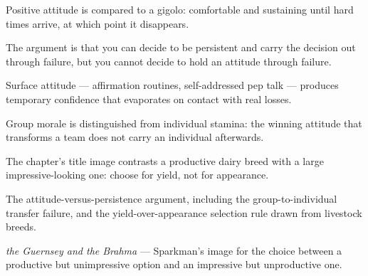 

\begin{distilled}
  \item Positive attitude is compared to a gigolo: comfortable and sustaining until hard times arrive, at which point it disappears.
  \item The argument is that you can decide to be persistent and carry the decision out through failure, but you cannot decide to hold an attitude through failure.
  \item Surface attitude --- affirmation routines, self-addressed pep talk --- produces temporary confidence that evaporates on contact with real losses.
  \item Group morale is distinguished from individual stamina: the winning attitude that transforms a team does not carry an individual afterwards.
  \item The chapter's title image contrasts a productive dairy breed with a large impressive-looking one: choose for yield, not for appearance.
\end{distilled}

\begin{unique}
  \item The attitude-versus-persistence argument, including the group-to-individual transfer failure, and the yield-over-appearance selection rule drawn from livestock breeds.
\end{unique}

\begin{terms}
  \item \emph{the Guernsey and the Brahma} --- Sparkman's image for the choice between a productive but unimpressive option and an impressive but unproductive one.
\end{terms}
